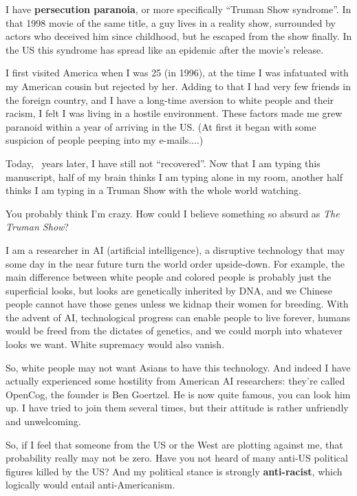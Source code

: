 \documentclass[12pt]{report}
\begin{document}
{
I have \textbf{persecution paranoia}, or more specifically ``Truman Show syndrome''.  In that 1998 movie of the same title, a guy lives in a reality show, surrounded by actors who deceived him since childhood, but he escaped from the show finally.  In the US this syndrome has spread like an epidemic after the movie's release.

I first visited America when I was 25 (in 1996), at the time I was infatuated with my American cousin but rejected by her.  Adding to that I had very few friends in the foreign country, and I have a long-time aversion to white people and their racism, I felt I was living in a hostile environment.  These factors made me grew paranoid within a year of arriving in the US.  (At first it began with some suspicion of people peeping into my e-mails....)

Today, \resultb ~years later, I have still not ``recovered''.  Now that I am typing this manuscript, half of my brain thinks I am typing alone in my room, another half thinks I am typing in a Truman Show with the whole world watching. 

You probably think I'm crazy.  How could I believe something so absurd as \textit{The Truman Show}?

I am a researcher in AI (artificial intelligence), a disruptive technology that may some day in the near future turn the world order upside-down.  For example, the main difference between white people and colored people is probably just the superficial looks, but looks are genetically inherited by DNA, and we Chinese people cannot have those genes unless we kidnap their women for breeding.  With the advent of AI, technological progress can enable people to live forever, humans would be freed from the dictates of genetics, and we could morph into whatever looks we want.  White supremacy would also vanish.

So, white people may not want Asians to have this technology.  And indeed I have actually experienced some hostility from American AI researchers:  they're called OpenCog, the founder is Ben Goertzel.  He is now quite famous, you can look him up.  I have tried to join them several times, but their attitude is rather unfriendly and unwelcoming.

So, if I feel that someone from the US or the West are plotting against me, that probability really may not be zero.  Have you not heard of many anti-US political figures killed by the US?  And my political stance is strongly \textbf{anti-racist}, which logically would entail anti-Americanism.

}
\end{document}
